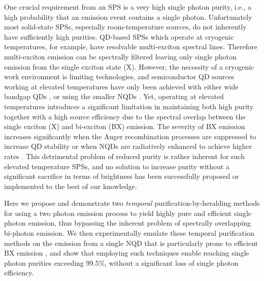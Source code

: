\documentclass[journal=nalefd,manuscript=letter]{achemso}
\begin{document}
One crucial requirement from an SPS is a very high single photon purity, i.e., a high probability that an emission event contains a single photon. 
Unfortunately most solid-state SPSs, especially room-temperature sources, do not inherently have sufficiently high purities. 
QD-based SPSs which operate at cryogenic temperatures, for example, have resolvable multi-exciton spectral lines.
Therefore multi-exciton emission can be spectrally filtered leaving only single photon emission from the single exciton state (X). 
However, the necessity of a  cryogenic work environment is limiting technologies, and semiconductor QD sources working at elevated temperatures have only been achieved with either wide bandgap QDs \cite{Arita2017UltracleanDot}, or using the smaller NQDs \cite{Lounis2000PhotonFluorescence,Michler2000QuantumTemperature}.  
Yet, operating at elevated temperatures introduces a significant limitation in maintaining both high purity together with a high source efficiency due to the spectral overlap between the single exciton (X) and bi-exciton (BX) emission.
The severity of BX emission increases significantly when the Auger recombination processes \cite{Efros2016OriginDots} are suppressed to increase QD stability or when NQDs are radiatively enhanced to achieve higher rates \cite{Park2013Single-NanocrystalTemperature,Wang2015CorrelatedPathways,Dey2016PlasmonicDots}. 
This detrimental problem of reduced purity is rather inherent for such elevated temperature SPSs, and no solution to increase purity without a significant sacrifice in terms of brightness has been successfully proposed or implemented to the best of our knowledge. 

Here we propose and demonstrate two \textit{temporal} purification-by-heralding methods for using a two photon emission process to yield highly pure and efficient single photon emission, thus bypassing the inherent problem of spectrally overlapping bi-photon emission.
We then experimentally emulate these temporal purification methods on the emission from a single NQD that is particularly prone to efficient BX emission \cite{Mangum2014InfluenceNanocrystals}, and show that employing such techniques enable reaching single photon purities exceeding 99.5\%, without a significant loss of single photon efficiency.

\end{document}
